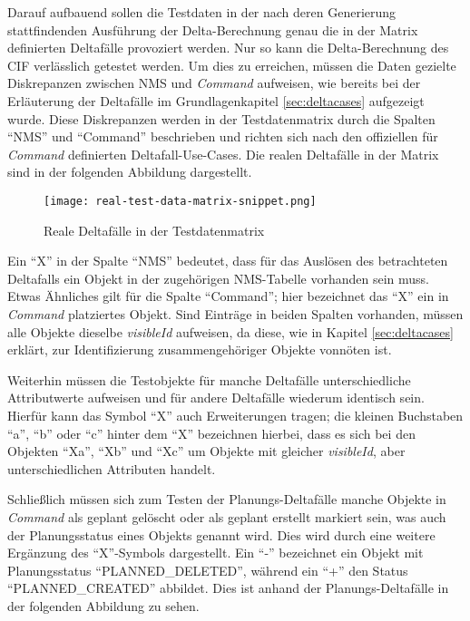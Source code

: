 Darauf aufbauend sollen die Testdaten in der nach deren Generierung stattfindenden Ausführung der Delta-Berechnung genau die in der Matrix definierten Deltafälle provoziert werden. Nur so kann die Delta-Berechnung des \ac{CIF} verlässlich getestet werden. Um dies zu erreichen, müssen die Daten gezielte Diskrepanzen zwischen \ac{NMS} und \textit{Command} aufweisen, wie bereits bei der Erläuterung der Deltafälle im Grundlagenkapitel \ref{sec:deltacases} aufgezeigt wurde. Diese Diskrepanzen werden in der Testdatenmatrix durch die Spalten \enquote{NMS} und \enquote{Command} beschrieben und richten sich nach den offiziellen für \textit{Command} definierten Deltafall-Use-Cases. \cite{fntusecases:2022} Die realen Deltafälle in der Matrix sind in der folgenden Abbildung dargestellt.

\begin{figure}[h]
    \centering
    \texttt{[image: real-test-data-matrix-snippet.png]}
    \caption{Reale Deltafälle in der Testdatenmatrix}
\end{figure}

Ein \enquote{X} in der Spalte \enquote{NMS} bedeutet, dass für das Auslösen des betrachteten Deltafalls ein Objekt in der zugehörigen \ac{NMS}-Tabelle vorhanden sein muss. Etwas Ähnliches gilt für die Spalte \enquote{Command}; hier bezeichnet das \enquote{X} ein in \textit{Command} platziertes Objekt. Sind Einträge in beiden Spalten vorhanden, müssen alle Objekte dieselbe \textit{visibleId} aufweisen, da diese, wie in Kapitel \ref{sec:deltacases} erklärt, zur Identifizierung zusammengehöriger Objekte vonnöten ist.

Weiterhin müssen die Testobjekte für manche Deltafälle unterschiedliche Attributwerte aufweisen und für andere Deltafälle wiederum identisch sein. Hierfür kann das Symbol \enquote{X} auch Erweiterungen tragen; die kleinen Buchstaben \enquote{a}, \enquote{b} oder \enquote{c} hinter dem \enquote{X} bezeichnen hierbei, dass es sich bei den Objekten \enquote{Xa}, \enquote{Xb} und \enquote{Xc} um Objekte mit gleicher \textit{visibleId}, aber unterschiedlichen Attributen handelt.

Schließlich müssen sich zum Testen der Planungs-Deltafälle manche Objekte in \textit{Command} als geplant gelöscht oder als geplant erstellt markiert sein, was auch der Planungsstatus eines Objekts genannt wird. Dies wird durch eine weitere Ergänzung des \enquote{X}-Symbols dargestellt. Ein \enquote{-} bezeichnet ein Objekt mit Planungsstatus \enquote{PLANNED\_DELETED}, während ein \enquote{+} den Status \enquote{PLANNED\_CREATED} abbildet. Dies ist anhand der Planungs-Deltafälle in der folgenden Abbildung zu sehen.

